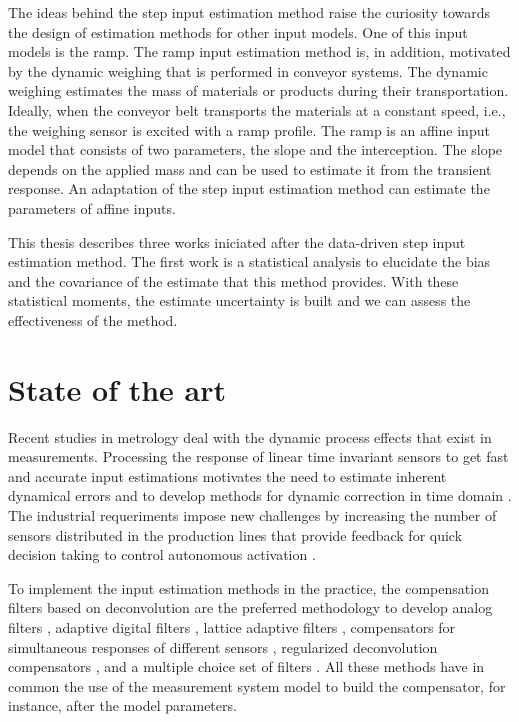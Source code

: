 The ideas behind the step input estimation method raise the curiosity towards the design of estimation methods for other input models.
One of this input models is the ramp.
The ramp input estimation method is, in addition, motivated by the dynamic weighing that is performed in conveyor systems.
The dynamic weighing estimates the mass of materials or products during their transportation.
Ideally, when the conveyor belt transports the materials at a constant speed, i.e., the weighing sensor is excited with a ramp profile. 
The ramp is an affine input model that consists of two parameters, the slope and the interception.
The slope depends on the applied mass and can be used to estimate it from the transient response.
An adaptation of the step input estimation method can estimate the parameters of affine inputs.

This thesis describes three works iniciated after the data-driven step input estimation method.
The first work is a statistical analysis to elucidate the bias and the covariance of the estimate that this method provides.
With these statistical moments, the estimate uncertainty is built and we can assess the effectiveness of the method.
   
 
\section{State of the art}

Recent studies in metrology deal with the dynamic process effects that exist in measurements.
Processing the response of linear time invariant sensors to get fast and accurate input estimations motivates the need to estimate inherent dynamical errors \citep{Hessling06} and to develop methods for dynamic correction in time domain \citep{Hessling08a}.
The industrial requeriments impose new challenges by increasing the number of sensors distributed in the production lines that provide feedback for quick decision taking to control autonomous activation \citep{Esward09}.  

To implement the input estimation methods in the practice, the compensation filters based on deconvolution \citep{Eichstadt10} are the preferred methodology to develop 
analog filters \citep{Jafaripanah05}, 
adaptive digital filters \citep{Shu93}, 
lattice adaptive filters \citep{Hernandez06}, 
compensators for simultaneous responses of different sensors \citep{Boschetti13}, 
regularized deconvolution compensators \citep{Dienstfrey14}, 
and a multiple choice set of filters \citep{Huang16}. 
All these methods have in common the use of the measurement system model to build the compensator, for instance, after the model parameters.


